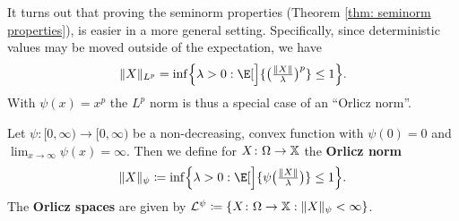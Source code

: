 It turns out that proving the seminorm properties (Theorem \ref{thm: seminorm
properties}), is easier in a more general setting. Specifically, since
deterministic values may be moved outside of the expectation, we have
\[
    \norm{X}_{L^p} = \inf\set[\Big]{\lambda > 0 : \E[\Big]{\bigl(\tfrac{\norm{X}}{\lambda}\bigr)^p} \le 1}.
\]
With \(\psi(x) = x^p\) the \(L^p\) norm is thus a special case of
an ``Orlicz norm''.
\begin{definition}
    \label{def: orlicz norm}
    Let \(\psi\colon [0,\infty) \to [0,\infty)\) be a non-decreasing, convex function
    with \(\psi(0) = 0\) and \(\lim_{x\to \infty} \psi(x) = \infty\). Then we define
    for \(X\colon \Omega \to \mathbb{X}\) the \textbf{Orlicz norm}
    \[
        \norm{X}_{\psi} \coloneq \inf\set[\Big]{\lambda > 0 : \E[\Big]{\psi\bigl(\tfrac{\norm{X}}{\lambda}\bigr)} \le 1}.
    \]
    The \textbf{Orlicz spaces} are given by \(\mathcal{L}^\psi \coloneq \{X\colon \Omega \to \mathbb{X} : \lVert X\rVert_{\psi} < \infty\}\).
\end{definition}

